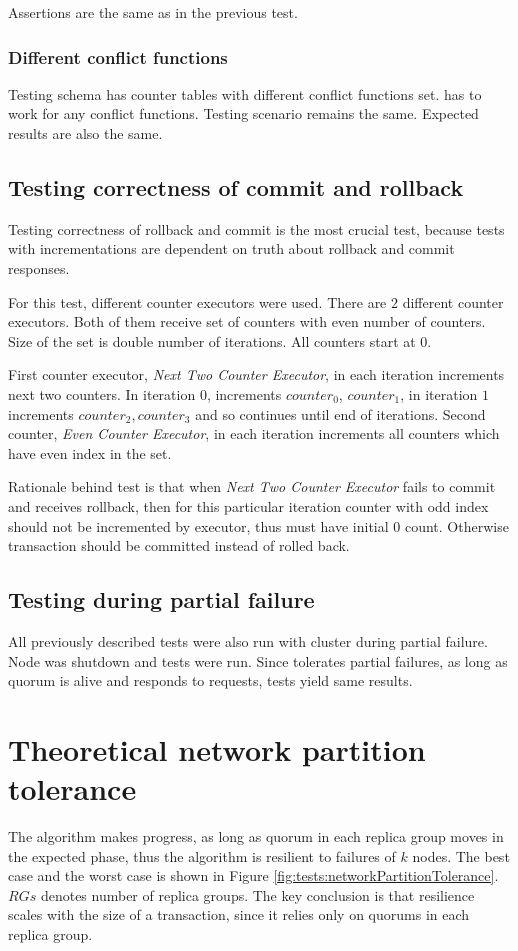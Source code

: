 Assertions are the same as in the previous test.

\subsubsection{Different conflict functions}
Testing schema has counter tables with different conflict functions set. \mpt has to work for any conflict functions. Testing scenario remains the same. Expected results are also the same.

\subsection{Testing correctness of commit and rollback}
Testing correctness of rollback and commit is the most crucial test, because tests with incrementations are dependent on truth about rollback and commit responses.

For this test, different counter executors were used. There are $2$ different counter executors. Both of them receive set of counters with even number of counters. Size of the set is double number of iterations. All counters start at $0$.

First counter executor, \emph{Next Two Counter Executor}, in each iteration increments next two counters. In iteration $0$, increments $counter_{0}$, $counter_{1}$, in iteration $1$ increments $counter_{2}, counter_{3}$ and so continues until end of iterations. Second counter, \emph{Even Counter Executor}, in each iteration increments all counters which have even index in the set.

Rationale behind test is that when \emph{Next Two Counter Executor} fails to commit and receives rollback, then for this particular iteration counter with odd index should not be incremented by executor, thus must have initial $0$ count. Otherwise transaction should be committed instead of rolled back.

\subsection{Testing during partial failure}

All previously described tests were also run with cluster during partial failure. Node was shutdown and tests were run. Since \mpt tolerates partial failures, as long as quorum is alive and responds to requests, tests yield same results.

\section{Theoretical network partition tolerance}
The algorithm makes progress, as long as quorum in each replica group moves in the expected phase, thus the algorithm is resilient to failures of $k$ nodes. The best case and the worst case is shown in Figure \ref{fig:tests:networkPartitionTolerance}. $RGs$ denotes number of replica groups. The key conclusion is that resilience scales with the size of a transaction, since it relies only on quorums in each replica group.

